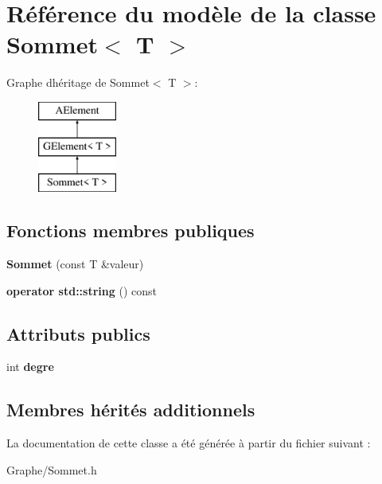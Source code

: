\hypertarget{class_sommet}{}\section{Référence du modèle de la classe Sommet$<$ T $>$}
\label{class_sommet}
Graphe d\textquotesingle{}héritage de Sommet$<$ T $>$\+:\begin{figure}[H]
\begin{center}
\leavevmode
\includegraphics[height=3.000000cm]{class_sommet}
\end{center}
\end{figure}
\subsection*{Fonctions membres publiques}
\begin{DoxyCompactItemize}
\item 
\mbox{\label{class_sommet_aa25765ad57f17ce7cbc104ee4a7659af}} 
{\bfseries Sommet} (const T \&valeur)
\item 
\mbox{\label{class_sommet_a70735f915a6a6c49dcd776617da75d74}} 
{\bfseries operator std\+::string} () const
\end{DoxyCompactItemize}
\subsection*{Attributs publics}
\begin{DoxyCompactItemize}
\item 
\mbox{\label{class_sommet_a7620e1078c18e8cf2a5793e281154147}} 
int {\bfseries degre}
\end{DoxyCompactItemize}
\subsection*{Membres hérités additionnels}


La documentation de cette classe a été générée à partir du fichier suivant \+:\begin{DoxyCompactItemize}
\item 
Graphe/Sommet.\+h\end{DoxyCompactItemize}
